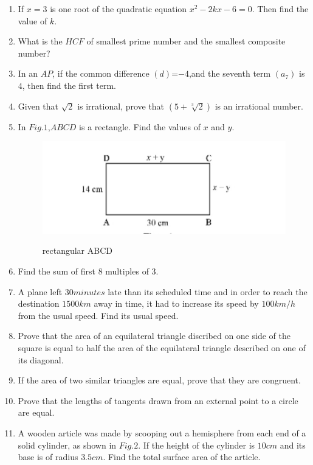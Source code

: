 \documentclass{article}
\begin{document}
\begin{enumerate}
\item If $x=3$ is one root of the quadratic equation $x^2-2kx-6=0$. Then find the value of $k$.
\item What is the $HCF$ of smallest prime number and the smallest composite number?
\item In an $AP$, if the common difference $(d)$=$-4$,and the seventh term $(a_{7})$ is $4$, then find the first term.
\item Given that $\sqrt{2}$ is irrational, prove that $(5+\sqrt[3]{2})$ is an irrational number.
\item In $Fig.1$,$ABCD$ is a rectangle. Find the values of $x$ and $y$.
	\begin{figure}[H]
        \includegraphics [width=\columnwidth] {./IMAGE3.jpg}
	\label{fig:fig1}
	\caption{rectangular ABCD}
	\end{figure}
\item Find the sum of first $8$ multiples of $3$.
\item A plane left $30 minutes$ late than its scheduled time and in order to reach the destination $1500km$ away in time, it had to increase its speed by $100km/h$ from the usual speed. Find its usual speed.
\item Prove that the area of an equilateral triangle discribed on one side of the square is equal to half the area of the equilateral triangle described on one of its diagonal.
\item If the area of two similar triangles are equal, prove that they are congruent.
\item Prove that the lengths of tangents drawn from an external point to a circle are equal.
\item A wooden article was made by scooping out a hemisphere from each end of a solid cylinder, as shown in $Fig.2$. If the height of the cylinder is $10cm$ and its base is of radius $3.5cm$. Find the total surface area of the article.
	\begin{figure}[H]

\end{figure}
\end{enumerate}
\end{document}
